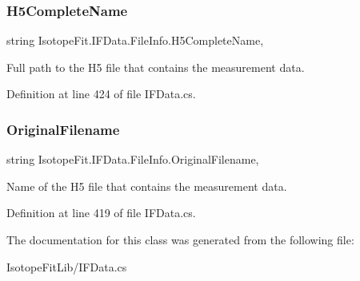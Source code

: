 \subsubsection{\texorpdfstring{H5\+Complete\+Name}{H5CompleteName}}
{\footnotesize\ttfamily string Isotope\+Fit.\+I\+F\+Data.\+File\+Info.\+H5\+Complete\+Name\hspace{0.3cm}{\ttfamily [get]}, {\ttfamily [set]}}



Full path to the H5 file that contains the measurement data. 



Definition at line 424 of file I\+F\+Data.\+cs.

\mbox{\label{class_isotope_fit_1_1_i_f_data_1_1_file_info_a465af980a8c2f2a971d213e328b5932c}} 
\subsubsection{\texorpdfstring{Original\+Filename}{OriginalFilename}}
{\footnotesize\ttfamily string Isotope\+Fit.\+I\+F\+Data.\+File\+Info.\+Original\+Filename\hspace{0.3cm}{\ttfamily [get]}, {\ttfamily [set]}}



Name of the H5 file that contains the measurement data. 



Definition at line 419 of file I\+F\+Data.\+cs.



The documentation for this class was generated from the following file\+:\begin{DoxyCompactItemize}
\item 
Isotope\+Fit\+Lib/I\+F\+Data.\+cs\end{DoxyCompactItemize}
